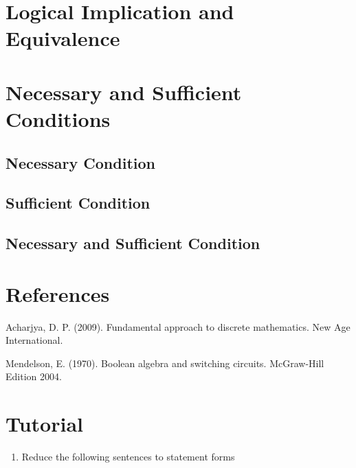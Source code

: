 \documentclass[]{book}
\providecommand{\tightlist}{%
  \setlength{\itemsep}{0pt}\setlength{\parskip}{0pt}}
\begin{document}
\hypertarget{logical-implication-and-equivalence}{%
\section{Logical Implication and Equivalence}\label{logical-implication-and-equivalence}}

\hypertarget{necessary-and-sufficient-conditions}{%
\section{Necessary and Sufficient Conditions}\label{necessary-and-sufficient-conditions}}

\hypertarget{necessary-condition}{%
\subsection{Necessary Condition}\label{necessary-condition}}

\hypertarget{sufficient-condition}{%
\subsection{Sufficient Condition}\label{sufficient-condition}}

\hypertarget{necessary-and-sufficient-condition}{%
\subsection{Necessary and Sufficient Condition}\label{necessary-and-sufficient-condition}}

\hypertarget{references-1}{%
\section*{References}\label{references-1}}

Acharjya, D. P. (2009). Fundamental approach to discrete mathematics. New Age International.

Mendelson, E. (1970). Boolean algebra and switching circuits. McGraw-Hill Edition 2004.

\newpage
{}

\hypertarget{tutorial-1}{%
\section*{Tutorial}\label{tutorial-1}}

\begin{enumerate}
\def\labelenumi{\arabic{enumi}.}
\tightlist
\item
  Reduce the following sentences to statement forms
\end{enumerate}
\end{document}
